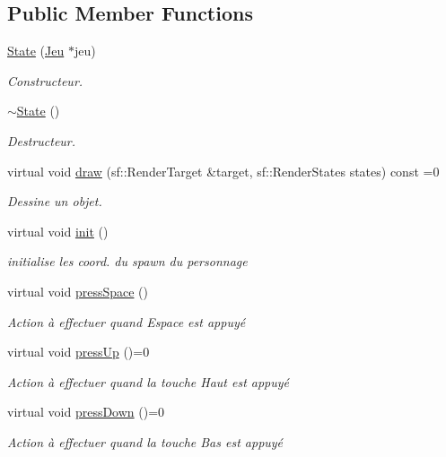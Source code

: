 \subsection*{Public Member Functions}
\begin{DoxyCompactItemize}
\item 
\hyperlink{class_state_a83d07567e1a24f802e5cb85ab55f3569}{State} (\hyperlink{class_jeu}{Jeu} $\ast$jeu)
\begin{DoxyCompactList}\small\item\em Constructeur. \end{DoxyCompactList}\item 
\hyperlink{class_state_afab438d92b90dc18d194dbd9c9c8bab3}{$\sim$\+State} ()
\begin{DoxyCompactList}\small\item\em Destructeur. \end{DoxyCompactList}\item 
virtual void \hyperlink{class_state_a7e115388c37a05ee165a395f3119d685}{draw} (sf\+::\+Render\+Target \&target, sf\+::\+Render\+States states) const =0
\begin{DoxyCompactList}\small\item\em Dessine un objet. \end{DoxyCompactList}\item 
virtual void \hyperlink{class_state_abe618d6673b514d93ccd6e4ced6ed992}{init} ()
\begin{DoxyCompactList}\small\item\em initialise les coord. du spawn du personnage \end{DoxyCompactList}\item 
virtual void \hyperlink{class_state_a8e992fd4ce2009a2f736ec674dadec3e}{press\+Space} ()
\begin{DoxyCompactList}\small\item\em Action à effectuer quand Espace est appuyé \end{DoxyCompactList}\item 
virtual void \hyperlink{class_state_ab3837b57093899dbdb323540c75a79e8}{press\+Up} ()=0
\begin{DoxyCompactList}\small\item\em Action à effectuer quand la touche Haut est appuyé \end{DoxyCompactList}\item 
virtual void \hyperlink{class_state_a0f77b5ab3a8cbdd35fef9d0d5b414e1f}{press\+Down} ()=0
\begin{DoxyCompactList}\small\item\em Action à effectuer quand la touche Bas est appuyé \end{DoxyCompactList}\item 

\end{DoxyCompactItemize}
